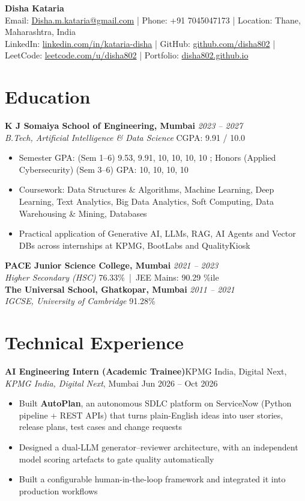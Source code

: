 \documentclass[10pt,a4paper]{article}
\newcommand{\entry}[4]{%
  \textbf{#1} \hfill \textit{#2}\\
  \textit{#3} \hfill #4\\[2pt]
}
\newcommand{\job}[4]{\textbf{#1}\ifx\relax#2\relax\else, \textit{#2}\fi, #3 \hfill #4\par\vspace{-1pt}}
\begin{document}
\begin{center}
  {\Huge \rmfamily\bfseries\color{HeadBlue} Disha Kataria}\\[4pt]
  {\small
    Email: \href{mailto:Disha.m.kataria@gmail.com}{Disha.m.kataria@gmail.com} \quad|\quad
    Phone: +91 7045047173 \quad|\quad
    Location: Thane, Maharashtra, India \\[2pt]
    LinkedIn: \href{https://linkedin.com/in/kataria-disha/}{linkedin.com/in/kataria-disha} \quad|\quad
    GitHub: \href{https://github.com/disha802}{github.com/disha802} \quad|\quad
    LeetCode: \href{https://leetcode.com/u/disha802/}{leetcode.com/u/disha802} \quad|\quad
    Portfolio: \href{https://disha802.github.io}{disha802.github.io}
  }
\end{center}
\vspace{-4pt}

\section*{Education}
\entry{K J Somaiya School of Engineering, Mumbai}{2023 -- 2027}
      {B.Tech, Artificial Intelligence \& Data Science}{CGPA: 9.91 / 10.0}
\begin{itemize}
  \item Semester GPA: (Sem 1--6) 9.53, 9.91, 10, 10, 10, 10 ; Honors (Applied Cybersecurity) (Sem 3--6) GPA: 10, 10, 10, 10 
  \item Coursework: Data Structures \& Algorithms, Machine Learning, Deep Learning, Text Analytics, Big Data Analytics, Soft Computing, Data Warehousing \& Mining, Databases
  \item Practical application of Generative AI, LLMs, RAG, AI Agents and Vector DBs across internships at KPMG, BootLabs and QualityKiosk
\end{itemize}
\entry{PACE Junior Science College, Mumbai}{2021 -- 2023}
      {Higher Secondary (HSC)}{76.33\% \,|\, JEE Mains: 90.29 \%ile}
\entry{The Universal School, Ghatkopar, Mumbai}{2011 -- 2021}
      {IGCSE, University of Cambridge}{91.28\%}

\section*{Technical Experience}

\job{AI Engineering Intern (Academic Trainee)}{KPMG India, Digital Next}{Mumbai}{Jun 2026 -- Oct 2026}
\begin{itemize}
  \item Built \textbf{AutoPlan}, an autonomous SDLC platform on ServiceNow (Python pipeline + REST APIs) that turns plain-English ideas into user stories, release plans, test cases and change requests
  \item Designed a dual-LLM generator--reviewer architecture, with an independent model scoring artefacts to gate quality automatically
  \item Built a configurable human-in-the-loop framework and integrated it into production workflows
\end{itemize}
\end{document}

